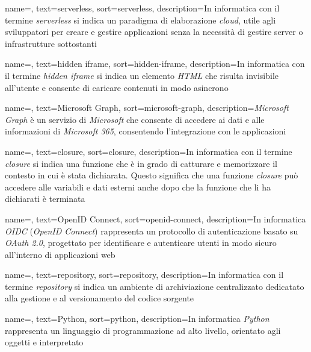  {
    name=,
    text=serverless,
    sort=serverless,
    description={In informatica con il termine \emph{serverless} si indica un paradigma di elaborazione \emph{cloud}, utile agli sviluppatori per creare e gestire applicazioni senza la necessità di gestire server o infrastrutture sottostanti}
}

 {
    name=,
    text=hidden iframe,
    sort=hidden-iframe,
    description={In informatica con il termine \emph{hidden iframe} si indica un elemento \emph{HTML} che risulta invisibile all'utente e consente di caricare contenuti in modo asincrono}
}

 {
    name=,
    text=Microsoft Graph,
    sort=microsoft-graph,
    description={\emph{Microsoft Graph} è un servizio di \emph{Microsoft} che consente di accedere ai dati e alle informazioni di \emph{Microsoft 365}, consentendo l'integrazione con le applicazioni}
}

 {
    name=,
    text=closure,
    sort=closure,
    description={In informatica con il termine \emph{closure} si indica una funzione che è in grado di catturare e memorizzare il contesto in cui è stata dichiarata. Questo significa che una funzione \emph{closure} può accedere alle variabili e dati esterni anche dopo che la funzione che li ha dichiarati è terminata}
}

 {
    name=,
    text=OpenID Connect,
    sort=openid-connect,
    description={In informatica \emph{OIDC} (\emph{OpenID Connect}) rappresenta un protocollo di autenticazione basato su \emph{OAuth 2.0}, progettato per identificare e autenticare utenti in modo sicuro all'interno di applicazioni web}
}


 {
    name=,
    text=repository,
    sort=repository,
    description={In informatica con il termine \emph{repository} si indica un ambiente di archiviazione centralizzato dedicatato alla gestione e al versionamento del codice sorgente}
}

 {
    name=,
    text=Python,
    sort=python,
    description={In informatica \emph{Python} rappresenta un linguaggio di programmazione ad alto livello, orientato agli oggetti e interpretato}
}


